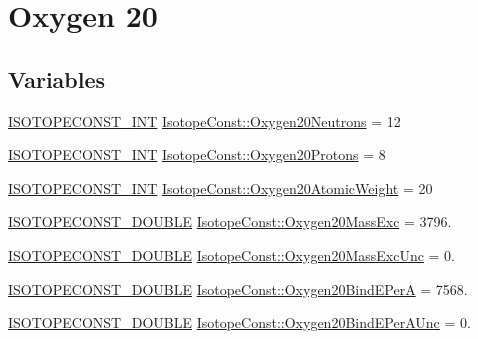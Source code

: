 \hypertarget{group___isotope_const-_oxygen-_o20}{}\section{Oxygen 20}
\label{group___isotope_const-_oxygen-_o20}
\subsection*{Variables}
\begin{DoxyCompactItemize}
\item 
\mbox{\hyperlink{group___isotope_const-_macros_ga5f18360b3e99483a35c32d789e62621c}{I\+S\+O\+T\+O\+P\+E\+C\+O\+N\+S\+T\+\_\+\+I\+NT}} \mbox{\hyperlink{group___isotope_const-_oxygen-_o20_ga466934bad55ca6ec510639df6ebd5523}{Isotope\+Const\+::\+Oxygen20\+Neutrons}} = 12
\item 
\mbox{\hyperlink{group___isotope_const-_macros_ga5f18360b3e99483a35c32d789e62621c}{I\+S\+O\+T\+O\+P\+E\+C\+O\+N\+S\+T\+\_\+\+I\+NT}} \mbox{\hyperlink{group___isotope_const-_oxygen-_o20_ga041a8f44134d187dcac56d2ca4d73d67}{Isotope\+Const\+::\+Oxygen20\+Protons}} = 8
\item 
\mbox{\hyperlink{group___isotope_const-_macros_ga5f18360b3e99483a35c32d789e62621c}{I\+S\+O\+T\+O\+P\+E\+C\+O\+N\+S\+T\+\_\+\+I\+NT}} \mbox{\hyperlink{group___isotope_const-_oxygen-_o20_ga3783e052f032bbea52b77c5fa6dd5348}{Isotope\+Const\+::\+Oxygen20\+Atomic\+Weight}} = 20
\item 
\mbox{\hyperlink{group___isotope_const-_macros_ga8f45a7272ce02c0b4c65c44636ed719a}{I\+S\+O\+T\+O\+P\+E\+C\+O\+N\+S\+T\+\_\+\+D\+O\+U\+B\+LE}} \mbox{\hyperlink{group___isotope_const-_oxygen-_o20_ga26c207da0755d1687dae8f40bb288ec1}{Isotope\+Const\+::\+Oxygen20\+Mass\+Exc}} = 3796.
\item 
\mbox{\hyperlink{group___isotope_const-_macros_ga8f45a7272ce02c0b4c65c44636ed719a}{I\+S\+O\+T\+O\+P\+E\+C\+O\+N\+S\+T\+\_\+\+D\+O\+U\+B\+LE}} \mbox{\hyperlink{group___isotope_const-_oxygen-_o20_ga93560e29230b0607b3c64fd7f27cd8a7}{Isotope\+Const\+::\+Oxygen20\+Mass\+Exc\+Unc}} = 0.
\item 
\mbox{\hyperlink{group___isotope_const-_macros_ga8f45a7272ce02c0b4c65c44636ed719a}{I\+S\+O\+T\+O\+P\+E\+C\+O\+N\+S\+T\+\_\+\+D\+O\+U\+B\+LE}} \mbox{\hyperlink{group___isotope_const-_oxygen-_o20_ga63062b0147d2b07264ed2e6606bef39b}{Isotope\+Const\+::\+Oxygen20\+Bind\+E\+PerA}} = 7568.
\item 
\mbox{\hyperlink{group___isotope_const-_macros_ga8f45a7272ce02c0b4c65c44636ed719a}{I\+S\+O\+T\+O\+P\+E\+C\+O\+N\+S\+T\+\_\+\+D\+O\+U\+B\+LE}} \mbox{\hyperlink{group___isotope_const-_oxygen-_o20_gad574ef4e15af348c495ac76dc70d9145}{Isotope\+Const\+::\+Oxygen20\+Bind\+E\+Per\+A\+Unc}} = 0.

\end{DoxyCompactItemize}
